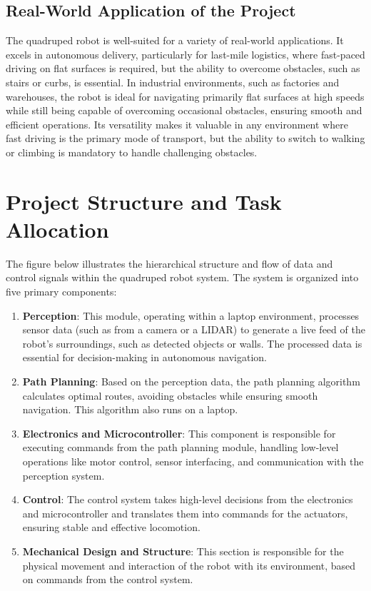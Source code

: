 \documentclass{article}
\begin{document}
\subsection{Real-World Application of the Project}

The quadruped robot is well-suited for a variety of real-world applications. It excels in autonomous delivery, particularly for last-mile logistics, where fast-paced driving on flat surfaces is required, but the ability to overcome obstacles, such as stairs or curbs, is essential. In industrial environments, such as factories and warehouses, the robot is ideal for navigating primarily flat surfaces at high speeds while still being capable of overcoming occasional obstacles, ensuring smooth and efficient operations. Its versatility makes it valuable in any environment where fast driving is the primary mode of transport, but the ability to switch to walking or climbing is mandatory to handle challenging obstacles.

\section{Project Structure and Task Allocation}

The figure below illustrates the hierarchical structure and flow of data and control signals within the quadruped robot system. The system is organized into five primary components:

\begin{enumerate}

    \item \textbf{Perception}: This module, operating within a laptop environment, processes sensor data (such as from a camera or a LIDAR) to generate a live feed of the robot’s surroundings, such as detected objects or walls. The processed data is essential for decision-making in autonomous navigation.
    
    \item \textbf{Path Planning}: Based on the perception data, the path planning algorithm calculates optimal routes, avoiding obstacles while ensuring smooth navigation. This algorithm also runs on a laptop.
    
    \item \textbf{Electronics and Microcontroller}: This component is responsible for executing commands from the path planning module, handling low-level operations like motor control, sensor interfacing, and communication with the perception system.
    
    \item \textbf{Control}: The control system takes high-level decisions from the electronics and microcontroller and translates them into commands for the actuators, ensuring stable and effective locomotion.
    
    \item \textbf{Mechanical Design and Structure}: This section is responsible for the physical movement and interaction of the robot with its environment, based on commands from the control system.
\end{enumerate}
    
\end{document}
